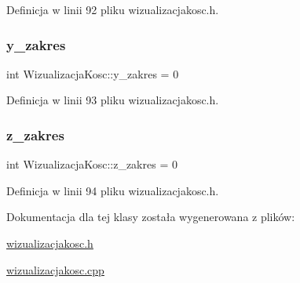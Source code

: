 Definicja w linii 92 pliku wizualizacjakosc.\+h.

\mbox{\label{class_wizualizacja_kosc_a61ee2d767b712866f93710c29cdd051d}} 
\subsubsection{\texorpdfstring{y\+\_\+zakres}{y\_zakres}}
{\footnotesize\ttfamily int Wizualizacja\+Kosc\+::y\+\_\+zakres = 0}



Definicja w linii 93 pliku wizualizacjakosc.\+h.

\mbox{\label{class_wizualizacja_kosc_abec9f7c00196751f1f97e8845a9c7d21}} 
\subsubsection{\texorpdfstring{z\+\_\+zakres}{z\_zakres}}
{\footnotesize\ttfamily int Wizualizacja\+Kosc\+::z\+\_\+zakres = 0}



Definicja w linii 94 pliku wizualizacjakosc.\+h.



Dokumentacja dla tej klasy została wygenerowana z plików\+:\begin{DoxyCompactItemize}
\item 
\hyperlink{wizualizacjakosc_8h}{wizualizacjakosc.\+h}\item 
\hyperlink{wizualizacjakosc_8cpp}{wizualizacjakosc.\+cpp}\end{DoxyCompactItemize}

